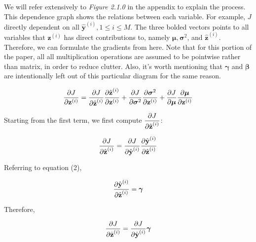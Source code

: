 \documentclass{article}
\begin{document}
\begin{multicols*}{2}
We will refer extensively to \textit{Figure 2.1.0} in the appendix 
to explain the process. This dependence graph shows the relations between 
each variable. For example, $J$ directly dependent on all $\hat{\textbf{y}}^{(i)}, 1 \leq i \leq M$.
The three bolded vectors points to all variables that $\textbf{z}^{(i)}$ has 
direct contributions to, namely $\boldsymbol{\mu}, \boldsymbol{\sigma}^2$, 
and $\hat{\textbf{z}}^{(i)}$. Therefore, we can formulate the gradients from here.
Note that for this portion of the paper, all all multiplication operations
are assumed to be pointwise rather than matrix, in order to reduce clutter.
Also, it's worth mentioning that $\boldsymbol{\gamma}$ and $\boldsymbol{\beta}$
are intentionally left out of this particular diagram for the same reason.

\begin{equation}
    {\partial J \over \partial \textbf{z}^{(i)}} = {\partial J \over \partial \hat{\textbf{z}}^{(i)}}
    {\partial \hat{\textbf{z}}^{(i)} \over \partial \textbf{z}^{(i)}}
     + {\partial J \over \partial \boldsymbol{\sigma}^2} 
     {\partial \boldsymbol{\sigma}^2 \over \partial \textbf{z}^{(i)}}
     + {\partial J \over \partial \boldsymbol{\mu}}
     {\partial \boldsymbol{\mu} \over \partial \textbf{z}^{(i)}}
\end{equation}

Starting from the first term, we first compute $\begin{aligned}
    {\partial J \over \partial \hat{\textbf{z}}^{(i)}}
\end{aligned}$:

\begin{equation}
    {\partial J \over \partial \hat{\textbf{z}}^{(i)}} = 
    {\partial J \over \partial \hat{\textbf{y}}^{(i)}} 
    {\partial \hat{\textbf{y}}^{(i)} \over \partial \hat{\textbf{z}}^{(i)}} \notag
\end{equation}

Referring to equation (2), 

\begin{equation}
    {\partial \hat{\textbf{y}}^{(i)} \over \partial \hat{\textbf{z}}^{(i)}} = \boldsymbol{\gamma} \notag
\end{equation}

Therefore, 

\begin{equation}
    {\partial J \over \partial \hat{\textbf{z}}^{(i)}} = 
    {\partial J \over \partial \hat{\textbf{y}}^{(i)}} \boldsymbol{\gamma} \notag
\end{equation}


\end{multicols*}
\end{document}
